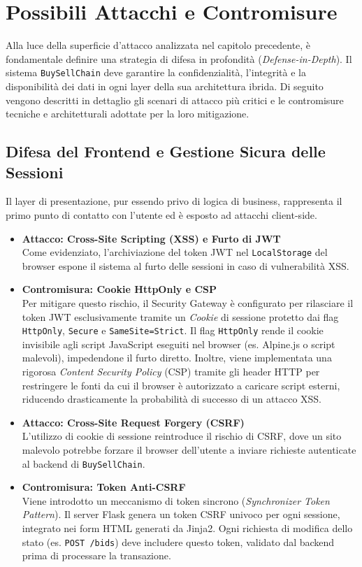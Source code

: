 \chapter{Possibili Attacchi e Contromisure}

Alla luce della superficie d'attacco analizzata nel capitolo precedente, è fondamentale definire una strategia di difesa in profondità (\textit{Defense-in-Depth}). Il sistema \texttt{BuySellChain} deve garantire la confidenzialità, l'integrità e la disponibilità dei dati in ogni layer della sua architettura ibrida. Di seguito vengono descritti in dettaglio gli scenari di attacco più critici e le contromisure tecniche e architetturali adottate per la loro mitigazione.

\section{Difesa del Frontend e Gestione Sicura delle Sessioni}

Il layer di presentazione, pur essendo privo di logica di business, rappresenta il primo punto di contatto con l'utente ed è esposto ad attacchi client-side.

\begin{itemize}
    \item \textbf{Attacco: Cross-Site Scripting (XSS) e Furto di JWT}\\
    Come evidenziato, l'archiviazione del token JWT nel \texttt{LocalStorage} del browser espone il sistema al furto delle sessioni in caso di vulnerabilità XSS.
    \item \textbf{Contromisura: Cookie HttpOnly e CSP}\\
    Per mitigare questo rischio, il Security Gateway è configurato per rilasciare il token JWT esclusivamente tramite un \textit{Cookie} di sessione protetto dai flag \texttt{HttpOnly}, \texttt{Secure} e \texttt{SameSite=Strict}. Il flag \texttt{HttpOnly} rende il cookie invisibile agli script JavaScript eseguiti nel browser (es. Alpine.js o script malevoli), impedendone il furto diretto. Inoltre, viene implementata una rigorosa \textit{Content Security Policy} (CSP) tramite gli header HTTP per restringere le fonti da cui il browser è autorizzato a caricare script esterni, riducendo drasticamente la probabilità di successo di un attacco XSS.
    
    \item \textbf{Attacco: Cross-Site Request Forgery (CSRF)}\\
    L'utilizzo di cookie di sessione reintroduce il rischio di CSRF, dove un sito malevolo potrebbe forzare il browser dell'utente a inviare richieste autenticate al backend di \texttt{BuySellChain}.
    \item \textbf{Contromisura: Token Anti-CSRF}\\
    Viene introdotto un meccanismo di token sincrono (\textit{Synchronizer Token Pattern}). Il server Flask genera un token CSRF univoco per ogni sessione, integrato nei form HTML generati da Jinja2. Ogni richiesta di modifica dello stato (es. \texttt{POST /bids}) deve includere questo token, validato dal backend prima di processare la transazione.
\end{itemize}

